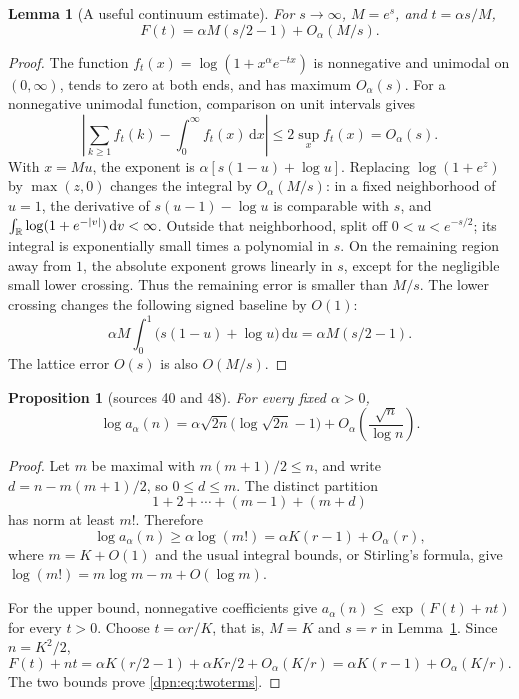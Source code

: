 \documentclass[11pt]{article}
\numberwithin{equation}{section}
\newtheorem{proposition}[theorem]{Proposition}
\newtheorem{lemma}[theorem]{Lemma}
\theoremstyle{definition}\newtheorem{definition}[theorem]{Definition}
\theoremstyle{remark}\newtheorem{remark}[theorem]{Remark}
\newcommand{\dd}{\,\mathrm d}\newcommand{\ii}{\mathrm i}
\begin{document}
\begin{lemma}[A useful continuum estimate]\label{dpn:lem:rough}
For $s\to\infty$, $M=e^s$, and $t=\alpha s/M$,
\begin{equation}\label{dpn:eq:roughF}
 F(t)=\alpha M(s/2-1)+O_\alpha(M/s).
\end{equation}
\end{lemma}
\begin{proof}
The function $f_t(x)=\log(1+x^\alpha e^{-tx})$ is nonnegative and unimodal
on $(0,\infty)$, tends to zero at both ends, and has maximum $O_\alpha(s)$.
For a nonnegative unimodal function, comparison on unit intervals gives
\[
 \left|\sum_{k\ge1}f_t(k)-\int_0^\infty f_t(x)\dd x\right|
 \le 2\sup_x f_t(x)=O_\alpha(s).
\]
With $x=Mu$, the exponent is $\alpha[s(1-u)+\log u]$. Replacing
$\log(1+e^z)$ by $\max(z,0)$ changes the integral by $O_\alpha(M/s)$:
in a fixed neighborhood of $u=1$, the derivative of $s(u-1)-\log u$
is comparable with $s$, and
$\int_\R\log(1+e^{-|v|})\dd v<\infty$.
Outside that neighborhood, split off $0<u<e^{-s/2}$; its integral is
exponentially small times a polynomial in $s$. On the remaining region
away from $1$, the absolute exponent grows linearly in $s$, except for the
negligible small lower crossing. Thus the remaining error is smaller than
$M/s$. The lower crossing changes the following signed baseline by $O(1)$:
\[
 \alpha M\int_0^1\bigl(s(1-u)+\log u\bigr)\dd u
       =\alpha M(s/2-1).
\]
The lattice error $O(s)$ is also $O(M/s)$.
\end{proof}

\begin{proposition}[sources 40 and 48]\label{dpn:prop:elementary}
For every fixed $\alpha>0$,
\begin{equation}\label{dpn:eq:twoterms}
 \log a_\alpha(n)=\alpha\sqrt{2n}\bigl(\log\sqrt{2n}-1\bigr)
                   +O_\alpha\left(\frac{\sqrt n}{\log n}\right).
\end{equation}
\end{proposition}
\begin{proof}
Let $m$ be maximal with $m(m+1)/2\le n$, and write
$d=n-m(m+1)/2$, so $0\le d\le m$. The distinct partition
\[
 1+2+\cdots+(m-1)+(m+d)
\]
has norm at least $m!$. Therefore
\[
 \log a_\alpha(n)\ge\alpha\log(m!)
   =\alpha K(r-1)+O_\alpha(r),
\]
where $m=K+O(1)$ and the usual integral bounds, or Stirling's formula, give
$\log(m!)=m\log m-m+O(\log m)$.

For the upper bound, nonnegative coefficients give
$a_\alpha(n)\le\exp(F(t)+nt)$ for every $t>0$.
Choose $t=\alpha r/K$, that is, $M=K$ and $s=r$ in
Lemma~\ref{dpn:lem:rough}. Since $n=K^2/2$,
\[
 F(t)+nt=\alpha K(r/2-1)+\alpha Kr/2+O_\alpha(K/r)
        =\alpha K(r-1)+O_\alpha(K/r).
\]
The two bounds prove \eqref{dpn:eq:twoterms}.
\end{proof}
\end{document}
